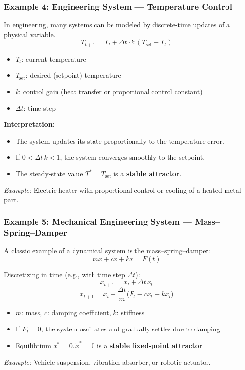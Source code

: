 \documentclass{beamer}
\begin{document}
\begin{frame}
    \frametitle{Example 4: Engineering System — Temperature Control}
{\small
    In engineering, many systems can be modeled by discrete-time updates of a physical variable.
    \[
    T_{t+1} = T_t + \Delta t \cdot k \, (T_{\text{set}} - T_t)
    \]
    \begin{itemize}
        \item \(T_t\): current temperature
        \item \(T_{\text{set}}\): desired (setpoint) temperature
        \item \(k\): control gain (heat transfer or proportional control constant)
        \item \(\Delta t\): time step
    \end{itemize}

    \vspace{0.5em}
    \textbf{Interpretation:}
    \begin{itemize}
        \item The system updates its state proportionally to the temperature error.
        \item If \(0 < \Delta t \, k < 1\), the system converges smoothly to the setpoint.
        \item The steady-state value \(T^* = T_{\text{set}}\) is a \textbf{stable attractor}.
    \end{itemize}

    \vspace{0.5em}
    \textit{Example:} Electric heater with proportional control or cooling of a heated metal part.
    }
\end{frame}


\begin{frame}
    \frametitle{Example 5: Mechanical Engineering System — Mass–Spring–Damper}

    A classic example of a dynamical system is the mass–spring–damper:
    \[
    m \ddot{x} + c \dot{x} + k x = F(t)
    \]

    Discretizing in time (e.g., with time step $\Delta t$):
    \[
    x_{t+1} = x_t + \Delta t \, \dot{x}_t
    \]
    \[
    \dot{x}_{t+1} = \dot{x}_t + \frac{\Delta t}{m} \big(F_t - c \dot{x}_t - k x_t \big)
    \]

    \begin{itemize}
        \item \(m\): mass, \(c\): damping coefficient, \(k\): stiffness
        \item If \(F_t = 0\), the system oscillates and gradually settles due to damping
        \item Equilibrium \(x^* = 0, \dot{x}^* = 0\) is a \textbf{stable fixed-point attractor}
    \end{itemize}

    \vspace{0.5em}
    \textit{Example:} Vehicle suspension, vibration absorber, or robotic actuator.
\end{frame}
\end{document}
